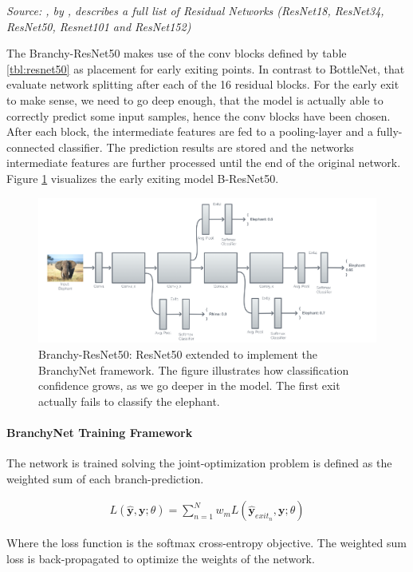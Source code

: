 	\vspace{-20pt} \textit{Source: , by \citeauthor{he_deep_2015} \cite{he_deep_2015}, describes a full list of Residual Networks (ResNet18, ResNet34, ResNet50, Resnet101 and ResNet152)}


The Branchy-ResNet50 makes use of the conv blocks defined by table \ref{tbl:resnet50} as placement for early exiting points. In contrast to BottleNet, that evaluate network splitting after each of the 16 residual blocks. For the early exit to make sense, we need to go deep enough, that the model is actually able to correctly predict some input samples, hence the conv blocks have been chosen. After each block, the intermediate features are fed to a pooling-layer and a fully-connected classifier. The prediction results are stored and the networks intermediate features are further processed until the end of the original network. Figure \ref{fig:b-resnet} visualizes the early exiting model B-ResNet50.

\begin{figure}
	\centering
	\includegraphics[width=\linewidth]{figures/models/BResNet}
	\caption[B-ResNet architecture]{Branchy-ResNet50: ResNet50 extended to implement the BranchyNet framework. The figure illustrates how classification confidence grows, as we go deeper in the model. The first exit actually fails to classify the elephant. }
	\label{fig:b-resnet}
\end{figure}



\paragraph{BranchyNet Training Framework}

The network is trained solving the joint-optimization problem is defined as the weighted sum of each branch-prediction.

\begin{align*}
	L(\hat{\mathbf{y}},\mathbf{y};\theta) = \sum_{n=1}^{N} w_m L(\hat{\mathbf{y}}_{exit_n},\mathbf{y};\theta)
\end{align*}

Where the loss function is the softmax cross-entropy objective.
The weighted sum loss is back-propagated to optimize the weights of the network. 